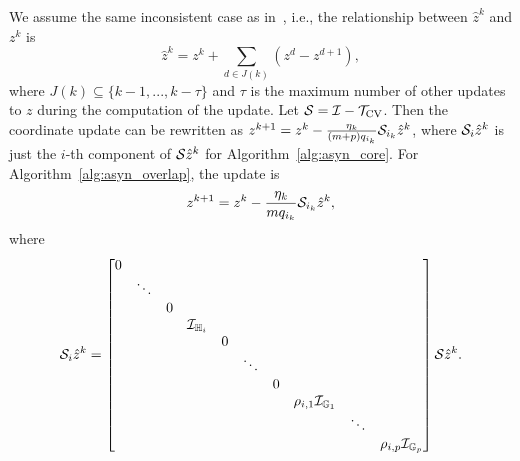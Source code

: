 We assume the same inconsistent case as in~\cite{Peng_2015_AROCK}, i.e., the relationship between $\hat z^k$ and $z^k$ is
\begin{equation}
\hat{z}^k=z^k+\sum_{d\in J(k)}(z^d-z^{d+1}),
\end{equation}
where $J(k)\subseteq \{k-1,...,k-\tau\}$ and $\tau$ is the maximum number of other updates to $z$ during the computation of the update. 
Let ${\mathcal{S}}={\mathcal{I}}-{{\mathcal{T}}_{\textnormal{CV}}}$. %
Then the coordinate update can be rewritten as $z^{k+1}=z^k-\frac{\eta_k}{(m+p)q_{i_k}}{\mathcal{S}}_{i_k}\hat{z}^k$, where ${\mathcal{S}}_{i}\hat{z}^k$ is just the $i$-th component of ${\mathcal{S}}\hat{z}^k$ for Algorithm~\ref{alg:asyn_core}. For Algorithm~\ref{alg:asyn_overlap}, the update is  
\begin{align}\label{eqn:asyn_update_a2}
z^{k+1}=z^k-\frac{\eta_k}{mq_{i_k}}\cS_{i_k}\hat{z}^k,
\end{align} where 
$$\cS_{i}\hat{z}^k=\begin{bmatrix}
0&&&&&&&&&\\
&\ddots&&&&&&&&\\
&&0&&&&&&&\\
&&&\cI_{\HH_i}&&&&&&\\
&&&&0&&&&&\\
&&&&&\ddots&&&&\\
&&&&&&0&&&\\
&&&&&&&\rho_{i,1}\cI_{\GG_1}&&\\
&&&&&&&&\ddots&\\
&&&&&&&&&\rho_{i,p}\cI_{\GG_p}
\end{bmatrix}\cS\hat{z}^k.$$
